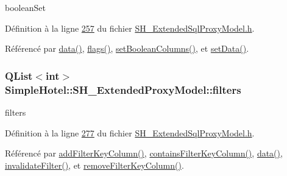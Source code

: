boolean\-Set 



Définition à la ligne \hyperlink{SH__ExtendedSqlProxyModel_8h_source_l00257}{257} du fichier \hyperlink{SH__ExtendedSqlProxyModel_8h_source}{S\-H\-\_\-\-Extended\-Sql\-Proxy\-Model.\-h}.



Référencé par \hyperlink{classSimpleHotel_1_1SH__ExtendedProxyModel_a25bc1047c6e9835d9d3c580e0a4ec42a}{data()}, \hyperlink{classSimpleHotel_1_1SH__ExtendedProxyModel_a13db609799a6c190772602574d0a8d7a}{flags()}, \hyperlink{classSimpleHotel_1_1SH__ExtendedProxyModel_a65e5c7011b2b31f61bf9a7dddabef27c}{set\-Boolean\-Columns()}, et \hyperlink{classSimpleHotel_1_1SH__ExtendedProxyModel_a94775c043450518596dab93676149b90}{set\-Data()}.

\hypertarget{classSimpleHotel_1_1SH__ExtendedProxyModel_a65b0d93138f5e83616bd277c038063ce}{
\subsubsection[{filters}]{\setlength{\rightskip}{0pt plus 5cm}Q\-List$<$int$>$ Simple\-Hotel\-::\-S\-H\-\_\-\-Extended\-Proxy\-Model\-::filters\hspace{0.3cm}{\ttfamily [private]}}}\label{classSimpleHotel_1_1SH__ExtendedProxyModel_a65b0d93138f5e83616bd277c038063ce}


filters 



Définition à la ligne \hyperlink{SH__ExtendedSqlProxyModel_8h_source_l00277}{277} du fichier \hyperlink{SH__ExtendedSqlProxyModel_8h_source}{S\-H\-\_\-\-Extended\-Sql\-Proxy\-Model.\-h}.



Référencé par \hyperlink{classSimpleHotel_1_1SH__ExtendedProxyModel_af8036ffa208ebaf55129cce307c3e296}{add\-Filter\-Key\-Column()}, \hyperlink{classSimpleHotel_1_1SH__ExtendedProxyModel_a4db5231a36976dd249ec1439422e331c}{contains\-Filter\-Key\-Column()}, \hyperlink{classSimpleHotel_1_1SH__ExtendedProxyModel_a25bc1047c6e9835d9d3c580e0a4ec42a}{data()}, \hyperlink{classSimpleHotel_1_1SH__ExtendedProxyModel_ac9bdf77bc05ce34a80652c4fa36f4bc1}{invalidate\-Filter()}, et \hyperlink{classSimpleHotel_1_1SH__ExtendedProxyModel_af549f904ee842d516f3cdbe60358a910}{remove\-Filter\-Key\-Column()}.

